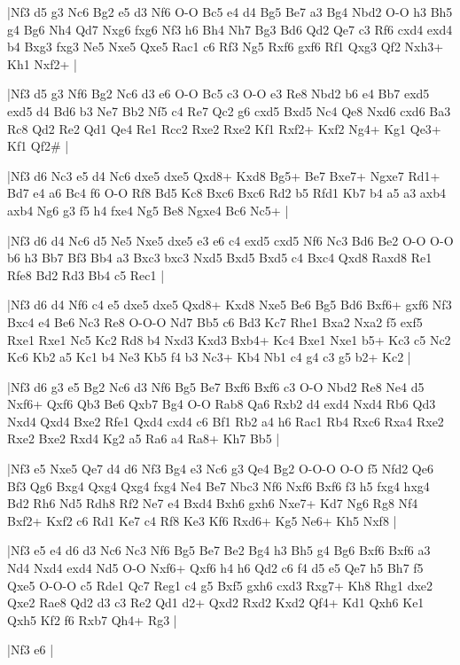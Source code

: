 \whitename{}
\blackname{}
\makegametitle
|Nf3 d5 g3 Nc6 Bg2 e5 d3 Nf6 O-O Bc5 e4 d4 Bg5 Be7 a3 Bg4 Nbd2 O-O h3 Bh5 g4 Bg6 Nh4 Qd7 Nxg6 fxg6 Nf3 h6 Bh4 Nh7 Bg3 Bd6 Qd2 Qe7 c3 Rf6 cxd4 exd4 b4 Bxg3 fxg3 Ne5 Nxe5 Qxe5 Rac1 c6 Rf3 Ng5 Rxf6 gxf6 Rf1 Qxg3 Qf2 Nxh3+ Kh1 Nxf2+  |

\whitename{}
\blackname{}
\makegametitle
|Nf3 d5 g3 Nf6 Bg2 Nc6 d3 e6 O-O Bc5 c3 O-O e3 Re8 Nbd2 b6 e4 Bb7 exd5 exd5 d4 Bd6 b3 Ne7 Bb2 Nf5 c4 Re7 Qc2 g6 cxd5 Bxd5 Nc4 Qe8 Nxd6 cxd6 Ba3 Rc8 Qd2 Re2 Qd1 Qe4 Re1 Rcc2 Rxe2 Rxe2 Kf1 Rxf2+ Kxf2 Ng4+ Kg1 Qe3+ Kf1 Qf2\#  |

\whitename{}
\blackname{}
\makegametitle
|Nf3 d6 Nc3 e5 d4 Nc6 dxe5 dxe5 Qxd8+ Kxd8 Bg5+ Be7 Bxe7+ Ngxe7 Rd1+ Bd7 e4 a6 Bc4 f6 O-O Rf8 Bd5 Kc8 Bxc6 Bxc6 Rd2 b5 Rfd1 Kb7 b4 a5 a3 axb4 axb4 Ng6 g3 f5 h4 fxe4 Ng5 Be8 Ngxe4 Bc6 Nc5+  |

\whitename{}
\blackname{}
\makegametitle
|Nf3 d6 d4 Nc6 d5 Ne5 Nxe5 dxe5 e3 e6 c4 exd5 cxd5 Nf6 Nc3 Bd6 Be2 O-O O-O b6 h3 Bb7 Bf3 Bb4 a3 Bxc3 bxc3 Nxd5 Bxd5 Bxd5 c4 Bxc4 Qxd8 Raxd8 Re1 Rfe8 Bd2 Rd3 Bb4 c5 Rec1  |

\whitename{}
\blackname{}
\makegametitle
|Nf3 d6 d4 Nf6 c4 e5 dxe5 dxe5 Qxd8+ Kxd8 Nxe5 Be6 Bg5 Bd6 Bxf6+ gxf6 Nf3 Bxc4 e4 Be6 Nc3 Re8 O-O-O Nd7 Bb5 c6 Bd3 Kc7 Rhe1 Bxa2 Nxa2 f5 exf5 Rxe1 Rxe1 Nc5 Kc2 Rd8 b4 Nxd3 Kxd3 Bxb4+ Kc4 Bxe1 Nxe1 b5+ Kc3 c5 Nc2 Kc6 Kb2 a5 Kc1 b4 Ne3 Kb5 f4 b3 Nc3+ Kb4 Nb1 c4 g4 c3 g5 b2+ Kc2  |

\whitename{}
\blackname{}
\makegametitle
|Nf3 d6 g3 e5 Bg2 Nc6 d3 Nf6 Bg5 Be7 Bxf6 Bxf6 c3 O-O Nbd2 Re8 Ne4 d5 Nxf6+ Qxf6 Qb3 Be6 Qxb7 Bg4 O-O Rab8 Qa6 Rxb2 d4 exd4 Nxd4 Rb6 Qd3 Nxd4 Qxd4 Bxe2 Rfe1 Qxd4 cxd4 c6 Bf1 Rb2 a4 h6 Rac1 Rb4 Rxc6 Rxa4 Rxe2 Rxe2 Bxe2 Rxd4 Kg2 a5 Ra6 a4 Ra8+ Kh7 Bb5  |

\whitename{}
\blackname{}
\makegametitle
|Nf3 e5 Nxe5 Qe7 d4 d6 Nf3 Bg4 e3 Nc6 g3 Qe4 Bg2 O-O-O O-O f5 Nfd2 Qe6 Bf3 Qg6 Bxg4 Qxg4 Qxg4 fxg4 Ne4 Be7 Nbc3 Nf6 Nxf6 Bxf6 f3 h5 fxg4 hxg4 Bd2 Rh6 Nd5 Rdh8 Rf2 Ne7 e4 Bxd4 Bxh6 gxh6 Nxe7+ Kd7 Ng6 Rg8 Nf4 Bxf2+ Kxf2 c6 Rd1 Ke7 c4 Rf8 Ke3 Kf6 Rxd6+ Kg5 Ne6+ Kh5 Nxf8  |

\whitename{}
\blackname{}
\makegametitle
|Nf3 e5 e4 d6 d3 Nc6 Nc3 Nf6 Bg5 Be7 Be2 Bg4 h3 Bh5 g4 Bg6 Bxf6 Bxf6 a3 Nd4 Nxd4 exd4 Nd5 O-O Nxf6+ Qxf6 h4 h6 Qd2 c6 f4 d5 e5 Qe7 h5 Bh7 f5 Qxe5 O-O-O c5 Rde1 Qc7 Reg1 c4 g5 Bxf5 gxh6 cxd3 Rxg7+ Kh8 Rhg1 dxe2 Qxe2 Rae8 Qd2 d3 c3 Re2 Qd1 d2+ Qxd2 Rxd2 Kxd2 Qf4+ Kd1 Qxh6 Ke1 Qxh5 Kf2 f6 Rxb7 Qh4+ Rg3  |

\whitename{}
\blackname{}
\makegametitle
|Nf3 e6  |

